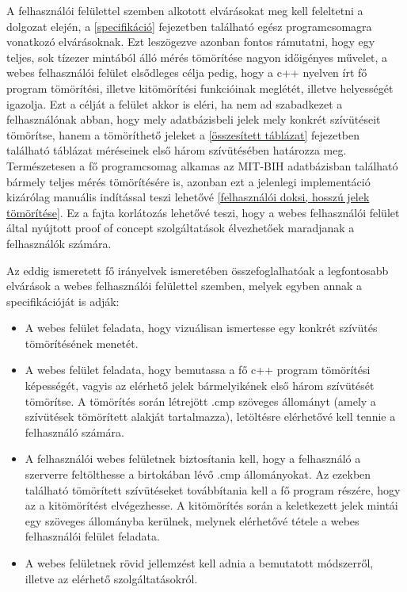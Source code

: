 \documentclass[oneside,titlepage,12pt,a4paper]{report}
\begin{document}
A felhasználói felülettel szemben alkotott elvárásokat meg kell feleltetni a dolgozat elején, a \ref{specifikáció} fejezetben található egész programcsomagra vonatkozó elvárásoknak. Ezt leszögezve azonban fontos rámutatni, hogy egy teljes, sok tízezer mintából álló mérés tömörítése nagyon időigényes művelet, a webes felhasználói felület elsődleges célja pedig, hogy a c++ nyelven írt fő program tömörítési, illetve kitömörítési funkcióinak meglétét, illetve helyességét igazolja. Ezt a célját a felület akkor is eléri, ha nem ad szabadkezet a felhasználónak abban, hogy mely adatbázisbeli jelek mely konkrét szívütéseit tömörítse, hanem a tömöríthető jeleket a \ref{összesített táblázat} fejezetben található táblázat méréseinek első három szívütésében határozza meg. Természetesen a fő programcsomag alkamas az MIT-BIH adatbázisban található bármely teljes mérés tömörítésére is, azonban ezt a jelenlegi implementáció kizárólag manuális indítással teszi lehetővé \ref{felhasználói doksi, hosszú jelek tömörítése}. Ez a fajta korlátozás lehetővé teszi, hogy a webes felhasználói felület által nyújtott proof of concept szolgáltatások élvezhetőek maradjanak a felhasználók számára. 
\par Az eddig ismeretett fő irányelvek ismeretében összefoglalhatóak a legfontosabb elvárások a webes felhasználói felülettel szemben, melyek egyben annak a specifikációját is adják:
\begin{itemize}
  \item A webes felület feladata, hogy vizuálisan ismertesse egy konkrét szívütés tömörítésének menetét.
  \item A webes felület feladata, hogy bemutassa a fő c++ program tömörítési képességét, vagyis az elérhető jelek bármelyikének első három szívütését tömörítse. A tömörítés során létrejött .cmp szöveges állományt (amely a szívütések tömörített alakját tartalmazza), letöltésre elérhetővé kell tennie a felhasználó számára. 
  \item A felhasználói webes felületnek biztosítania kell, hogy a felhasználó a szerverre feltölthesse a birtokában lévő .cmp állományokat. Az ezekben található tömörített szívütéseket továbbítania kell a fő program részére, hogy az a kitömörítést elvégezhesse. A kitömörítés során a keletkezett jelek mintái egy szöveges állományba kerülnek, melynek elérhetővé tétele a webes felhasználói felület feladata.
  \item A webes felületnek rövid jellemzést kell adnia a bemutatott módszerről, illetve az elérhető szolgáltatásokról. 
\end{itemize}
   
\end{document}
